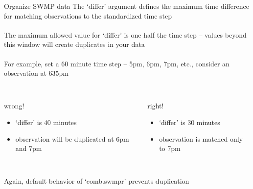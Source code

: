 \documentclass[xcolor=svgnames]{beamer}\usepackage[]{graphicx}\usepackage[]{color}
\begin{document}
\begin{frame}[containsverbatim]{Organize SWMP data}
The `differ' argument defines the maximum time difference for matching observations to the standardized time step \\~\\
The maximum allowed value for `differ' is one half the time step -- values beyond this window will create duplicates in your data \\~\\
For example, set a 60 minute time step -- 5pm, 6pm, 7pm, etc., consider an observation at 635pm \\~\\
\begin{columns}[T]
\begin{column}{0.45\textwidth}
\alert{wrong!}\\
\begin{itemize}
\item `differ' is 40 minutes
\item observation will be duplicated at 6pm and 7pm \\~\\
\end{itemize}
\end{column}
\begin{column}{0.45\textwidth}
\alert{right!}
\begin{itemize}
\item `differ' is 30 minutes
\item observation is matched only to 7pm \\~\\
\end{itemize}
\end{column}
\end{columns}
Again, default behavior of `comb.swmpr' prevents duplication
\end{frame}
\end{document}
